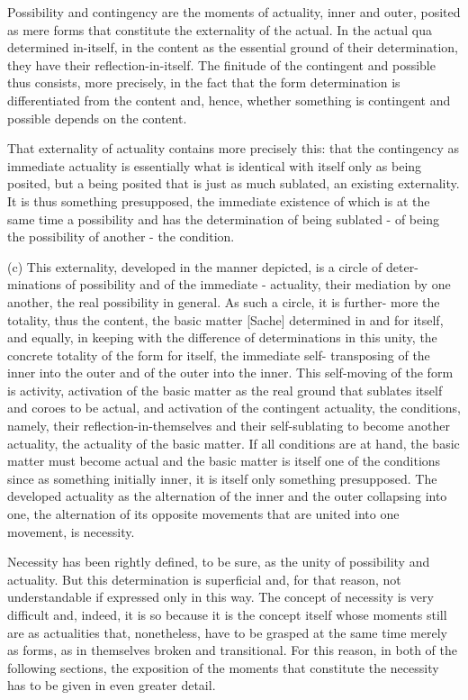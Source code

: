 Possibility and contingency are the moments of actuality, inner and outer,
posited as mere forms that constitute the externality of the actual.
In the actual qua determined in-itself,
in the content as the essential ground of their determination,
they have their reflection-in-itself.
The finitude of the contingent and possible thus consists,
more precisely, in the fact that the form determination is
differentiated from the content and, hence,
whether something is contingent and possible depends on the content.

That externality of actuality contains more precisely this:
that the contingency as immediate actuality is
essentially what is identical with itself only as being posited,
but a being posited that is just as much sublated,
 an existing externality.
It is thus something presupposed,
the immediate existence of which is
at the same time a possibility and has the determination of being sublated -
of being the possibility of another - the condition.

(c) This externality, developed in the manner depicted, is a circle of deter-
minations of possibility and of the immediate - actuality, their mediation
by one another, the real possibility in general. As such a circle, it is further-
more the totality, thus the content, the basic matter [Sache] determined in
and for itself, and equally, in keeping with the difference of determinations
in this unity, the concrete totality of the form for itself, the immediate self-
transposing of the inner into the outer and of the outer into the inner. This
self-moving of the form is activity, activation of the basic matter as the real
ground that sublates itself and coroes to be actual, and activation of the
contingent actuality, the conditions, namely, their reflection-in-themselves
and their self-sublating to become another actuality, the
actuality of the basic matter.
If all conditions are at hand, the basic matter must become actual
and the basic matter is itself one of the conditions
since as something initially inner,
it is itself only something presupposed.
The developed actuality as the alternation
of the inner and the outer collapsing into one,
the alternation of its opposite movements
that are united into one movement, is necessity.

    Necessity has been rightly defined, to be sure,
    as the unity of possibility and actuality.
    But this determination is superficial
    and, for that reason, not understandable
    if expressed only in this way.
    The concept of necessity is very difficult
    and, indeed, it is so because it is the concept itself
    whose moments still are as actualities that,
    nonetheless, have to be grasped at the same time merely as forms, as
    in themselves broken and transitional.
    For this reason, in both of the following sections,
    the exposition of the moments that
    constitute the necessity has to be given
    in even greater detail.

